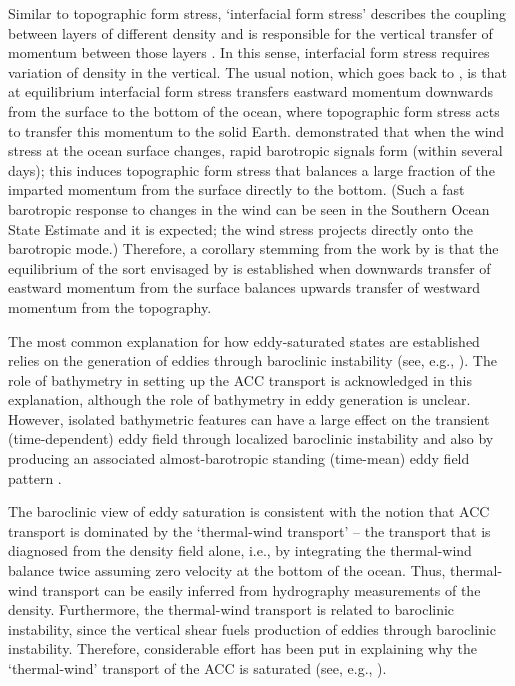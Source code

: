 \documentclass{agujournal2019}
\begin{document}
Similar to topographic form stress, `interfacial form stress' describes the coupling between layers of different density and is responsible for the vertical transfer of momentum between those layers \cite{Johnson-Bryden-1989,Olbers-etal-2004,Ward-Hogg-2011}. In this sense, interfacial form stress requires variation of density in the vertical. The usual notion, which goes back to , is that at equilibrium interfacial form stress transfers eastward momentum downwards from the surface to the bottom of the ocean, where topographic form stress acts to transfer this momentum to the solid Earth.  demonstrated that when the wind stress at the ocean surface changes, rapid barotropic signals form (within several days); this induces topographic form stress that balances a large fraction of the imparted momentum from the surface directly to the bottom. (Such a fast barotropic response to changes in the wind can be seen in the Southern Ocean State Estimate \cite{Masich-etal-2015} and it is expected; the wind stress projects directly onto the barotropic mode.) {\color{black}Therefore, a corollary stemming from the work by  is that the} equilibrium of the sort envisaged by  is established when downwards transfer of eastward momentum from the surface balances upwards transfer of westward momentum from the topography.


The most common explanation for how eddy-saturated states are established relies on the generation of eddies through baroclinic instability (see, e.g., ). The role of bathymetry in setting up the ACC transport is acknowledged in this explanation, although the role of bathymetry in eddy generation is unclear. However, isolated bathymetric features can have a large effect on the transient (time-dependent) eddy field through localized baroclinic instability and also {\color{black}by producing} an associated almost-barotropic standing (time-mean) eddy field pattern \cite{Abernathey-Cessi-2014}. 


The baroclinic view of eddy saturation is consistent with the notion that ACC transport is dominated by the `thermal-wind transport' -- the transport that is diagnosed from the density field alone{\color{black}, i.e., by integrating the thermal-wind balance twice} assuming zero velocity at the bottom of the ocean. Thus, thermal-wind transport can be easily inferred from hydrography measurements of the density. Furthermore, the thermal-wind transport is related to baroclinic instability, since the vertical shear  fuels production of eddies through baroclinic instability. Therefore, considerable effort has been put in explaining why the `thermal-wind' transport of the ACC is saturated (see, e.g., ).
\end{document}
